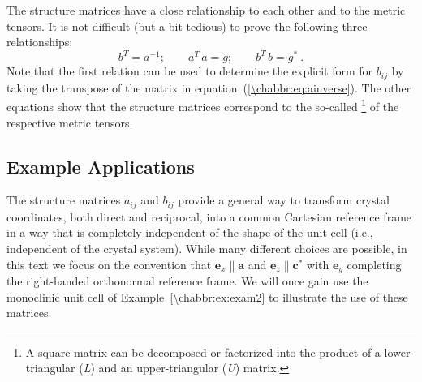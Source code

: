 The structure matrices have a close relationship to each other and to the metric tensors. It is not difficult (but a bit tedious) to prove the following three relationships:
\begin{equation}
	b^T = a^{-1};\qquad a^T\,a=g;\qquad b^T\,b=g^{\ast}\ .
\end{equation}
Note that the first relation can be used to determine the explicit form for $b_{ij}$ by taking the transpose of the matrix in equation~(\ref{\chabbr:eq:ainverse}). The other equations show that the structure matrices correspond to the so-called \footnote{A square matrix can be decomposed or factorized into the product of a lower-triangular (\textit{L}) and an upper-triangular (\textit{U}) matrix.} of the respective metric tensors.  

\subsection{Example Applications}\label{\chabbr:ssec:SMexamples}
The structure matrices $a_{ij}$ and $b_{ij}$ provide a general way to transform crystal coordinates, both direct and reciprocal, into a common Cartesian reference frame in a way that is completely independent of the shape of the unit cell (i.e., independent of the crystal system).  While many different choices are possible, in this text we focus on the convention that $\mathbf{e}_x\parallel\mathbf{a}$ and $\mathbf{e}_z\parallel\mathbf{c}^{\ast}$ with $\mathbf{e}_y$ completing the right-handed orthonormal reference frame.  We will once gain use the monoclinic unit cell of Example~\ref{\chabbr:ex:exam2} to illustrate the use of these matrices.

